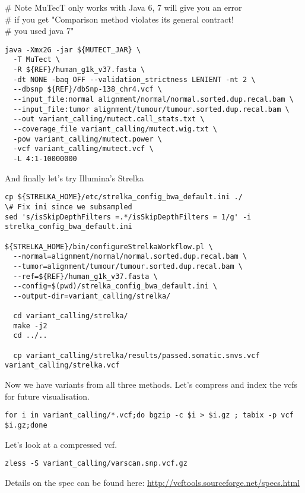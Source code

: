 \# Note MuTecT only works with Java 6, 7 will give you an error \\
\# if you get "Comparison method violates its general contract! \\
\# you used java 7"

\begin{lstlisting}
java -Xmx2G -jar ${MUTECT_JAR} \
  -T MuTect \
  -R ${REF}/human_g1k_v37.fasta \
  -dt NONE -baq OFF --validation_strictness LENIENT -nt 2 \
  --dbsnp ${REF}/dbSnp-138_chr4.vcf \
  --input_file:normal alignment/normal/normal.sorted.dup.recal.bam \
  --input_file:tumor alignment/tumour/tumour.sorted.dup.recal.bam \
  --out variant_calling/mutect.call_stats.txt \
  --coverage_file variant_calling/mutect.wig.txt \
  -pow variant_calling/mutect.power \
  -vcf variant_calling/mutect.vcf \
  -L 4:1-10000000
\end{lstlisting}

And finally let's try Illumina's Strelka

\begin{lstlisting}
cp ${STRELKA_HOME}/etc/strelka_config_bwa_default.ini ./
\# Fix ini since we subsampled
sed 's/isSkipDepthFilters =.*/isSkipDepthFilters = 1/g' -i strelka_config_bwa_default.ini

${STRELKA_HOME}/bin/configureStrelkaWorkflow.pl \
  --normal=alignment/normal/normal.sorted.dup.recal.bam \
  --tumor=alignment/tumour/tumour.sorted.dup.recal.bam \
  --ref=${REF}/human_g1k_v37.fasta \
  --config=$(pwd)/strelka_config_bwa_default.ini \
  --output-dir=variant_calling/strelka/

  cd variant_calling/strelka/
  make -j2
  cd ../..

  cp variant_calling/strelka/results/passed.somatic.snvs.vcf variant_calling/strelka.vcf
\end{lstlisting}

Now we have variants from all three methods. Let's compress and index the vcfs for future visualisation.

\begin{lstlisting}
for i in variant_calling/*.vcf;do bgzip -c $i > $i.gz ; tabix -p vcf $i.gz;done
\end{lstlisting}

Let's look at a compressed vcf.

\begin{lstlisting}
zless -S variant_calling/varscan.snp.vcf.gz
\end{lstlisting}

Details on the spec can be found here:
\url{http://vcftools.sourceforge.net/specs.html}

